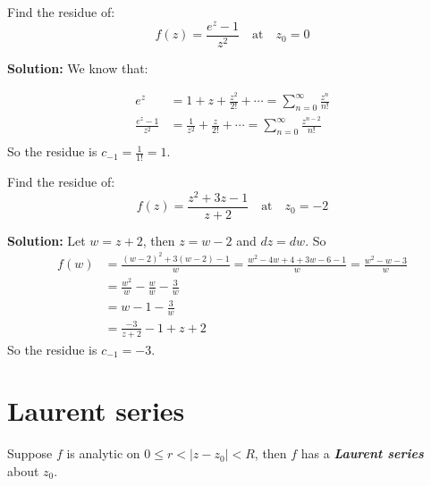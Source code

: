 \begin{example}
    Find the residue of:
    $$f(z) = \frac{e^z -1}{z^2} \quad \text{at} \quad z_0 = 0$$

    \textbf{Solution:} We know that:

    \begin{align*}
        e^z                 & = 1 + z + \frac{z^2}{2!} + \cdots = \sum_{n=0}^{\infty} \frac{z^n}{n!}           \\
        \frac{e^z - 1}{z^2} & = \frac{1}{z^2} + \frac{z}{2!} + \cdots = \sum_{n=0}^{\infty} \frac{z^{n-2}}{n!} \\
    \end{align*}
    So the residue is $c_{-1} = \frac{1}{1!} = 1$.
\end{example}

\begin{example}
    Find the residue of:
    $$ f(z) = \frac{z^2 + 3z -1}{z+2} \quad \text{at} \quad z_0 = -2$$

    \textbf{Solution:}
    Let $w = z + 2$, then $z = w - 2$ and $dz = dw$. So
    \begin{align*}
        f(w) & = \frac{(w-2)^2 + 3(w-2) - 1}{w} = \frac{w^2 - 4w + 4 + 3w - 6 - 1}{w} = \frac{w^2 - w - 3}{w} \\
             & = \frac{w^2}{w} - \frac{w}{w} - \frac{3}{w}                                                    \\
             & = w - 1 - \frac{3}{w}                                                                          \\
             & = \frac{-3}{z + 2} - 1 + z + 2
    \end{align*}
    So the residue is $c_{-1} = -3$.
\end{example}

\section{Laurent series}

\begin{definition}
    Suppose $f$ is analytic on $0 \leq r < |z - z_0| < R$, then $f$ has a \textbf{\textit{Laurent series}} about $z_0$.
\end{definition}

